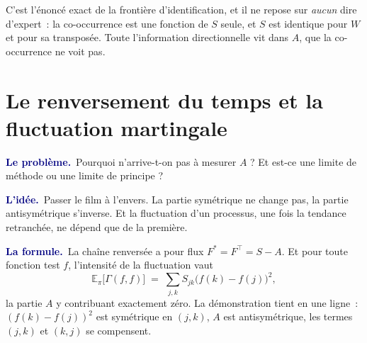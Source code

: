 \documentclass[11pt,a4paper]{article}
\providecommand{\Prob}{\mathbb{P}}
\newcommand{\lequoi}[1]{\smallskip\noindent\textcolor{navy}{\textbf{Le problème.}}\ #1\par}
\newcommand{\lidee}[1]{\smallskip\noindent\textcolor{navy}{\textbf{L'idée.}}\ #1\par}
\newcommand{\laformule}[1]{\smallskip\noindent\textcolor{navy}{\textbf{La formule.}}\ #1\par}
\begin{document}
\begin{center}
\end{center}

\noindent C'est l'énoncé exact de la frontière d'identification, et il ne repose sur
\emph{aucun} dire d'expert~: la co-occurrence est une fonction de $S$ seule, et $S$ est
identique pour $W$ et pour sa transposée. Toute l'information directionnelle vit dans $A$, que
la co-occurrence ne voit pas.

\section{Le renversement du temps et la fluctuation martingale}

\lequoi{Pourquoi n'arrive-t-on pas à mesurer $A$ ? Et est-ce une limite de méthode ou une
limite de principe ?}

\lidee{Passer le film à l'envers. La partie symétrique ne change pas, la partie
antisymétrique s'inverse. Et la fluctuation d'un processus, une fois la tendance retranchée,
ne dépend que de la première.}

\laformule{La chaîne renversée a pour flux $F^{*}=F^{\top}=S-A$. Et pour toute fonction test
$f$, l'intensité de la fluctuation vaut
\[
  \mathbb{E}_\pi\bigl[\Gamma(f,f)\bigr]
  \;=\;\sum_{j,k} S_{jk}\bigl(f(k)-f(j)\bigr)^2 ,
\]
la partie $A$ y contribuant exactement zéro. La démonstration tient en une ligne~:
$(f(k)-f(j))^2$ est symétrique en $(j,k)$, $A$ est antisymétrique, les termes $(j,k)$ et
$(k,j)$ se compensent.}
\end{document}
